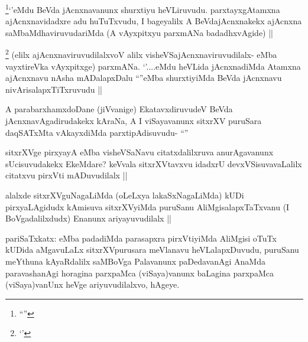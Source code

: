 
\begin{artha}
\footnote{``\stext''}`\stext'eMdu BeVda jAcnxnavanunx shurxtiyu heVLiruvudu. parxtayxgAtamxna ajAcnxnavidadxre adu huTuTxvudu, I bageyalilx A BeVdajAcnxnakekx ajAcnxna saMbaMdhaviruvudariMda (A vAyxpitxyu parxmANa badadhxvAgide) ||
\end{artha}

\begin{artha}
\footnote{`\stext'}
(elilx ajAcnxnaviruvudilalxvoV alilx visheVSajAcnxnaviruvudilalx- eMba vayxtireVka vAyxpitxge) parxmANa. `\stext'....eMdu heVLida jAcnxnadiMda Atamxna ajAcnxnavu nAsha mADalapxDalu ``\stext''eMba shurxtiyiMda BeVda jAcnxnavu nivArisalapxTiTxruvudu ||
\end{artha}


\begin{artha}
A parabarxhamxdoDane (jiVvanige) EkatavxdiruvudeV BeVda jAcnxnavAgadirudakekx kAraNa, A I viSayavanunx sitxrXV puruSara daqSATxMta vAkayxdiMda parxtipAdisuvudu- ``\stext''
\end{artha}


\begin{artha}
sitxrXVge pirxyayA eMba visheVSaNavu citatxdalilxruva anurAgavanunx sUcisuvudakekx EkeMdare? keVvala sitxrXVtavxvu idadxrU devxVSisuvavaLalilx citatxvu pirxVti mADuvudilalx ||
\end{artha}

\begin{artha}
alalxde sitxrXVguNagaLiMda (oLeLxya lakaSxNagaLiMda) kUDi pirxyaLAgidudx kAmisuva sitxrXVyiMda puruSanu AliMgisalapxTaTxvanu (I BoVgadalilxdudx) Enanunx ariyayuvudilalx ||
\end{artha}


\begin{artha}
pariSaTxkatx: eMba padadiMda parasapxra pirxVtiyiMda AliMgisi oTuTx kUDida aMgavuLaLx sitxrXVpurusara meVlanavu heVLalapxDuvudu, puruSanu meYthuna kAyaRdalilx saMBoVga Palavanunx paDedavanAgi AnaMda paravashanAgi horagina parxpaMca (viSaya)vanunx baLagina parxpaMca (viSaya)vanUnx heVge ariyuvudilalxvo, hAgeye.
\end{artha}

